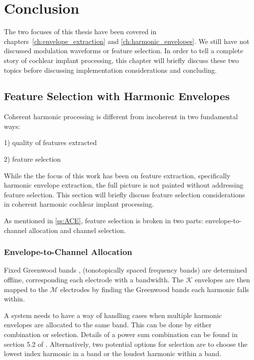 \documentclass [11pt, proquest,oneside] {ganter_thesis}[2015/03/03]
\begin{document}
\chapter{Conclusion}\label{ch:conclusion}

The two focuses of this thesis have been covered in chapters~\ref{ch:envelope_extraction} and \ref{ch:harmonic_envelopes}.  We still have not discussed modulation waveforms or feature selection.  In order to tell a complete story of cochlear implant processing, this chapter will briefly discuss these two topics before discussing implementation considerations and concluding.

\section{Feature Selection with Harmonic Envelopes}

Coherent harmonic processing is different from incoherent in two fundamental ways:

1) quality of features extracted

2) feature selection

While the the focus of this work has been on feature extraction, specifically harmonic envelope extraction, the full picture is not painted without addressing feature selection.  This section will briefly discuss feature selection considerations in coherent harmonic cochlear implant processing.

As mentioned in \ref{ss:ACE}, feature selection is broken in two parts: envelope-to-channel allocation and channel selection.

\subsection{Envelope-to-Channel Allocation}

Fixed Greenwood bands \cite{greenwood1961critical}, (tonotopically spaced frequency bands) are determined offline, corresponding each electrode with a bandwidth.  The $\mathcal{K}$ envelopes are then mapped to the $\mathcal{M}$ electrodes by finding the Greenwood bands each harmonic falls within.

A system needs to have a way of handling cases when multiple harmonic envelopes are allocated to the same band.  This can be done by either combination or selection.  Details of a power sum combination can be found in section 5.2 of \cite{laneau2005deaf}.  Alternatively, two potential options for selection are to choose the lowest index harmonic in a band or the loudest harmonic within a band.
\end{document}
